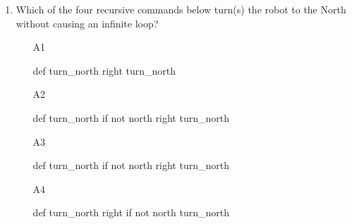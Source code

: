 \begin{enumerate}
\begin{enumerate}
\end{enumerate}
\item Which of the four recursive commands below 
turn(s) the robot to the North without causing an infinite loop?
\begin{enumerate}
\item[A1]
\begin{bluecode}
def turn_north
    right
    turn_north
\end{bluecode}
\item[A2] 
\begin{bluecode}
def turn_north
    if not north
        right
    turn_north
\end{bluecode}
\item[A3] 
\begin{bluecode}
def turn_north
    if not north
        right
        turn_north
\end{bluecode}
\item[A4] 
\begin{bluecode}
def turn_north
    right
    if not north 
        turn_north
\end{bluecode}
\end{enumerate}
\end{enumerate}




